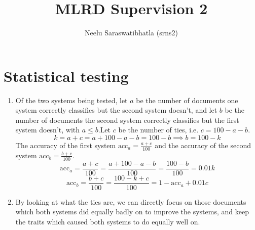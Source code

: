 \documentclass[12pt]{article}
\author{Neelu Saraswatibhatla (srns2)}
\title{MLRD Supervision 2}
\date{\vspace{-5ex}}
\begin{document}
\maketitle

\section*{Statistical testing}
\begin{enumerate}
    \item Of the two systems being tested, let $a$ be the number of documents one system correctly classifies but the second system doesn't, and let $b$ be the number of documents the second system correctly classifies but the first system doesn't, with $a \leq b$.Let $c$ be the number of ties, i.e. $c = 100 - a - b$.
          \[
              k = a + c = a + 100 - a - b = 100 - b \implies b = 100 - k
          \]
          The accuracy of the first system $\text{acc}_a = \frac{a+c}{100}$ and the accuracy of the second system $\text{acc}_b = \frac{b+c}{100}$.
          \[
              \text{acc}_a = \frac{a+c}{100} = \frac{a + 100 - a - b}{100} = \frac{100 - b}{100} = 0.01k
          \]
          \[
              \text{acc}_b = \frac{b+c}{100} = \frac{100 - k + c}{100} = 1 - \text{acc}_a + 0.01c
          \]

    \item By looking at what the ties are, we can directly focus on those documents which both systems did equally badly on to improve the systems, and keep the traits which caused both systems to do equally well on.

\end{enumerate}
\end{document}
